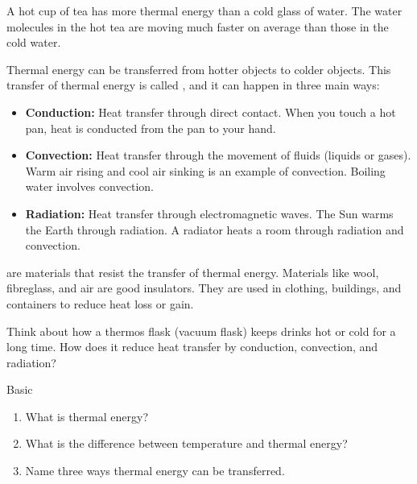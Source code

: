 \begin{example}
A hot cup of tea has more thermal energy than a cold glass of water. The water molecules in the hot tea are moving much faster on average than those in the cold water.
\end{example}

Thermal energy can be transferred from hotter objects to colder objects. This transfer of thermal energy is called , and it can happen in three main ways:

\begin{itemize}
    \item \textbf{Conduction:} Heat transfer through direct contact.  When you touch a hot pan, heat is conducted from the pan to your hand.
    \item \textbf{Convection:} Heat transfer through the movement of fluids (liquids or gases).  Warm air rising and cool air sinking is an example of convection.  Boiling water involves convection.
    \item \textbf{Radiation:} Heat transfer through electromagnetic waves.  The Sun warms the Earth through radiation.  A radiator heats a room through radiation and convection.
\end{itemize}

\begin{marginnote}
 are materials that resist the transfer of thermal energy.  Materials like wool, fibreglass, and air are good insulators.  They are used in clothing, buildings, and containers to reduce heat loss or gain.
\end{marginnote}

\begin{stopandthink}
Think about how a thermos flask (vacuum flask) keeps drinks hot or cold for a long time. How does it reduce heat transfer by conduction, convection, and radiation?
\end{stopandthink}


\begin{tieredquestions}{Basic}
\begin{enumerate}
    \item What is thermal energy?
    \item What is the difference between temperature and thermal energy?
    \item Name three ways thermal energy can be transferred.
\end{enumerate}
\end{tieredquestions}


